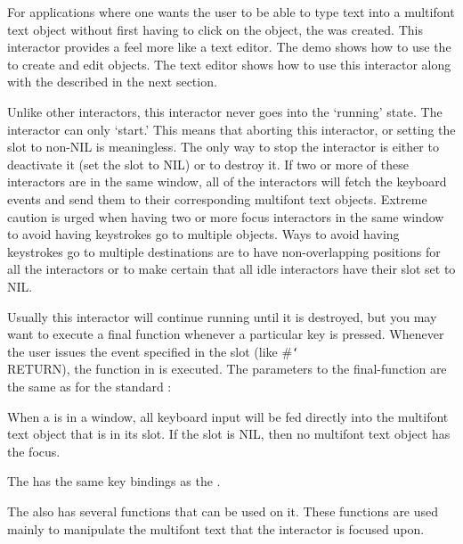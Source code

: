 For applications where one wants the user to be able to type text into a
multifont text object without first having to click on the object, the
 was created.  This interactor provides
a feel more like a text editor.  The demo  shows how to
use the  to create and edit 
objects.  The  text editor shows how to use this
interactor along with the  described in the
next section.

Unlike other interactors, this interactor never goes into the `running' state.
The interactor can only `start.'  This means that aborting this interactor,
or setting the  slot to non-{\sc NIL} is meaningless.  The only
way to stop the interactor is either to deactivate it (set the 
slot to {\sc NIL}) or to destroy it.  If two or more of these interactors are in
the same window, all of the interactors will fetch the keyboard events and
send them to their corresponding multifont text objects.  Extreme caution
is urged when having two or more focus interactors in the same window to avoid
having keystrokes go to multiple objects.  Ways to avoid having keystrokes go
to multiple destinations are to have non-overlapping 
positions for all the interactors or to make certain that all idle interactors
have their  slot set to {\sc NIL}.

Usually this interactor will continue running until it is destroyed, but you may
want to execute a final function whenever a particular key is pressed.
Whenever the user issues the event specified in the  slot
(like \#{\tt\char`\\}RETURN), the function in  is executed.
The parameters to the final-function are the same as for the standard
:

When a 
is in a window, all keyboard input will be fed directly into the multifont
text object that is in its  slot.  If the
 slot is {\sc NIL}, then no multifont text object has
the focus.

The  has the same key bindings as the
.

The  also has several functions that can
be used on it.  These functions are used mainly to manipulate the multifont
text that the interactor is focused upon.

